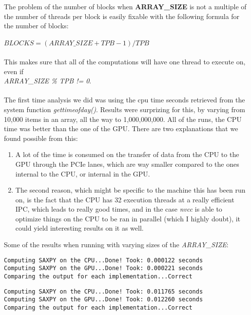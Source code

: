\documentclass[english]{exam}
\begin{document}
The problem of the number of blocks when \textbf{ARRAY\_SIZE} is not a multiple of the number of threads per block is easily fixable with the following formula for the number of blocks:\\\\
$BLOCKS = (ARRAY\_SIZE + TPB - 1) / TPB$
\\\\
This makes sure that all of the computations will have one thread to execute on, even if \\ \textit{ARRAY\_SIZE \% TPB != 0}.
\\\\
\noindent
The first time analysis we did was using the cpu time seconds retrieved from the system function \textit{gettimeofday()}. Results were surprizing for this, by varying from 10,000 items in an array, all the way to 1,000,000,000. All of the runs, the CPU time was better than the one of the GPU. There are two explanations that we found possible from this:

\begin{enumerate}
\item A lot of the time is consumed on the transfer of data from the CPU to the GPU through the PCIe lanes, which are way smaller compared to the ones internal to the CPU, or internal in the GPU.
\item The second reason, which might be specific to the machine this has been run on, is the fact that the CPU has 32 execution threads at a really efficient IPC, which leads to really good times, and in the case \textit{nvcc} is able to optimize things on the CPU to be ran in parallel (which I highly doubt), it could yield interesting results on it as well.
\end{enumerate}

\noindent
Some of the results when running with varying sizes of the \textit{ARRAY\_SIZE}:\\

\begin{lstlisting}
Computing SAXPY on the CPU...Done! Took: 0.000122 seconds
Computing SAXPY on the GPU...Done! Took: 0.000221 seconds
Comparing the output for each implementation...Correct
\end{lstlisting}

\begin{lstlisting}
Computing SAXPY on the CPU...Done! Took: 0.011765 seconds
Computing SAXPY on the GPU...Done! Took: 0.012260 seconds
Comparing the output for each implementation...Correct
\end{lstlisting}
\end{document}
